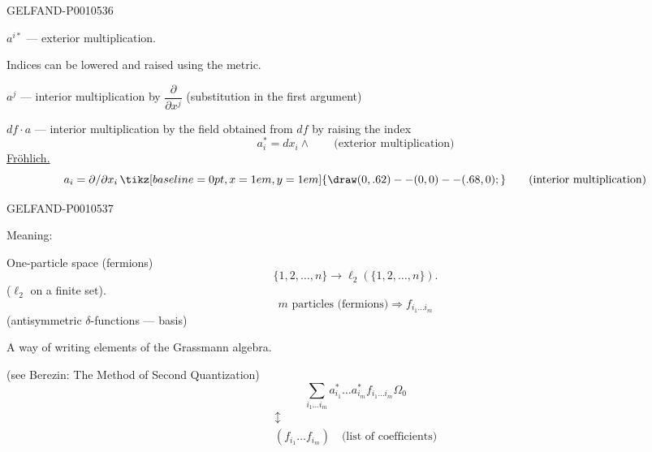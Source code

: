 \begin{GelfandAdjacentEvidence}{GELFAND-P001053}{6}


$a^{i*}$ — exterior multiplication.

Indices can be lowered and raised using the metric.

$a^j$ — interior multiplication by $\dfrac{\partial}{\partial x^j}$ (substitution in the first argument)

$df\cdot a$ — interior multiplication by the field obtained from $df$ by raising the index
\[
a_i^*=dx_i\wedge\qquad\text{(exterior multiplication)}
\]
\underline{Fröhlich.}
\[
a_i=\partial/\partial x_i\,
\tikz[baseline=0pt,x=1em,y=1em]{\draw (0,.62)--(0,0)--(.68,0);}
\qquad\text{(interior multiplication)}
\]
\end{GelfandAdjacentEvidence}
\begin{GelfandAdjacentEvidence}{GELFAND-P001053}{7}

Meaning:

One-particle space (fermions)
\[
\{1,2,\ldots,n\}\to\ell_2(\{1,2,\ldots,n\}).
\]
($\ell_2$ on a finite set).
\[
m\text{ particles (fermions)}\Rightarrow f_{i_1\ldots i_m}
\]
(antisymmetric $\delta$-functions — basis)

A way of writing elements of the Grassmann algebra.

(see Berezin: The Method of Second Quantization)
\begin{equation*}
\sum_{i_1\ldots i_m}a_{i_1}^*\ldots a_{i_m}^*f_{i_1\ldots i_m}\Omega_0
\tag{4}
\end{equation*}
\[
\begin{gathered}
\updownarrow\\
(f_{i_1}\ldots f_{i_m})\quad\text{(list of coefficients)}
\end{gathered}
\]
\end{GelfandAdjacentEvidence}



